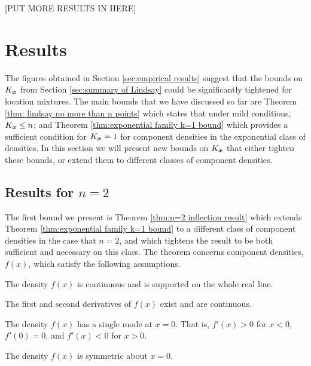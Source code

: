 	[PUT MORE RESULTS IN HERE]

	\section{Results}
		\label{sec:mixture results}
		The figures obtained in Section \ref{sec:empirical results} suggest that the bounds on $K_{\bm{{x}}}$ from Section \ref{sec:summary of Lindsay} could be significantly tightened for location mixtures. The main bounds that we have discussed so far are Theorem \ref{thm: lindsay no more than n points} which states that under mild conditions, $K_{\bm{{x}}} \leq n$; and Theorem \ref{thm:exponential family k=1 bound} which provides a sufficient condition for $K_{\bm{{x}}} = 1$ for component densities in the exponential class of densities. In this section we will present new bounds on $K_{\bm{{x}}}$ that either tighten these bounds, or extend them to different classes of component densities.

		\subsection{Results for \texorpdfstring{$n = 2$}{n = 2}}
		The first bound we present is Theorem \ref{thm:n=2 inflection result} which extends Theorem \ref{thm:exponential family k=1 bound} to a different class of component densities in the case that $n=2$, and which tightens the result to be both sufficient and necessary on this class. The theorem concerns component densities, $f(x)$, which satisfy the following assumptions.

		\begin{assumption}[Continuity]
		\label{assump:reallinesupport}
			The density $f(x)$ is continuous and is supported on the whole real line.
		\end{assumption}

		\begin{assumption}[Differentiability]
		\label{assump:twicediff}
			The first and second derivatives of $f(x)$ exist and are continuous.
		\end{assumption}
		
		\begin{assumption}[Unimodality]
			The density $f(x)$ has a single mode at $x=0$. That is, $f'(x) > 0$ for $x <0$, $f'(0) = 0$, and $f'(x) < 0$ for $x>0$.
			\label{assump:singlemode}
		\end{assumption}
		
		\begin{assumption}[Symmetry]
			The density $f(x)$ is symmetric about $x = 0$.
			\label{assump:symmetric}
		\end{assumption}
		
